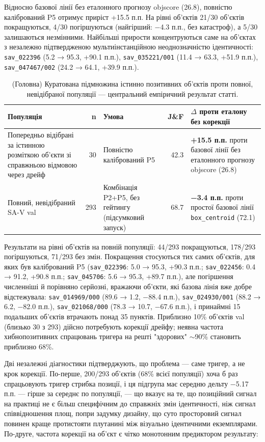 \documentclass[11pt]{article}
\begin{document}
Відносно базової лінії без еталонного прогнозу objscore (26.8), повністю калібрований P5 отримує приріст +15.5 п.п. На рівні об'єктів 21/30 об'єктів покращуються, 4/30 погіршуються (найгірший: −4.3 п.п., без катастроф), а 5/30 залишаються незмінними. Найбільші прирости концентруються саме на об'єктах з незалежно підтвердженою мультиінстанційною неоднозначністю ідентичності: \texttt{sav\_022396} (5.2 → 95.3, +90.1 п.п.), \texttt{sav\_035221/001} (11.4 → 63.3, +51.9 п.п.), \texttt{sav\_047467/002} (24.2 → 64.1, +39.9 п.п.).

\begin{table}[!htbp]
\centering
\caption{(Головна) Куратована підмножина істинно позитивних об'єктів проти повної, невідібраної популяції --- центральний емпіричний результат статті.}
\label{tab:5}
\small
\begin{tabularx}{\textwidth}{@{}LrLrL@{}}
\toprule
Популяція & n & Умова & J\&F & $\Delta$ проти еталону без корекції \\
\midrule
Попередньо відібрані за істинною розміткою об'єкти зі справжньою відмовою через дрейф & 30 & Повністю калібрований P5 & 42.3 & \textbf{+15.5 п.п.} проти базової лінії без еталонного прогнозу objscore (26.8) \\
Повний, невідібраний SA-V val & 293 & Комбінація P2+P5, без гейтингу (підсумковий запуск) & 68.7 & \textbf{−3.4 п.п.} проти простої базової лінії \texttt{box\_centroid} (72.1) \\
\bottomrule
\end{tabularx}
\end{table}

Результати на рівні об'єктів на повній популяції: 44/293 покращуються, 178/293 погіршуються, 71/293 без змін. Покращення стосуються тих самих об'єктів, для яких був калібрований P5 (\texttt{sav\_022396}: 5.0 → 95.3, +90.3 п.п.; \texttt{sav\_022456}: 0.4 → 91.2, +90.8 п.п.; \texttt{sav\_045706}: 5.6 → 95.3, +89.7 п.п.), але погіршення численніші й порівняно серйозні, вражаючи об'єкти, які базова лінія вже добре відстежувала: \texttt{sav\_014969/000} (89.6 → 1.2, −88.4 п.п.), \texttt{sav\_024930/001} (88.2 → 6.2, −82.0 п.п.), \texttt{sav\_021068/000} (78.3 → 10.7, −67.6 п.п.), і принаймні 15 подальших об'єктів втрачають понад 35 пунктів. Приблизно 10\% об'єктів val (близько 30 з 293) дійсно потребують корекції дрейфу; неявна частота хибнопозитивних спрацювань тригера на решті "здорових" $\sim$90\% становить приблизно 68\%.

Дві незалежні діагностики підтверджують, що проблема --- саме тригер, а не крок корекції. По-перше, 200/293 об'єктів (68\% всієї популяції) хоча б раз спрацьовують тригер стрибка позиції, і ця підгрупа має середню дельту −5.17 п.п. --- гірше за середнє по популяції, --- що вказує на те, що позиційний сигнал на практиці не є більш специфічним до справжніх змін ідентичності, ніж сигнал співвідношення площ, попри задумку дизайну, що суто просторовий сигнал повинен краще протистояти плутанині між візуально ідентичними екземплярами. По-друге, частота корекції на об'єкт є чітко монотонним предиктором результату:
\end{document}
